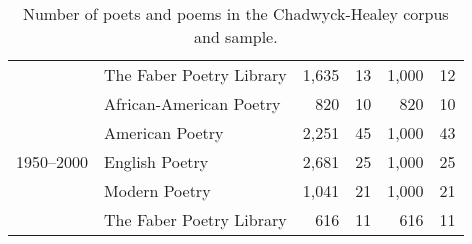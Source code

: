 \begin{table}[t]
{\begin{tabular}{llrrrr}
   & The Faber Poetry Library & 1,635 & 13 & 1,000 & 12 \\
  \cline{1-6}
  \multirow[t]{5}{*}{1950--2000} & African-American Poetry & 820 & 10 & 820 & 10 \\
   & American Poetry & 2,251 & 45 & 1,000 & 43 \\
   & English Poetry & 2,681 & 25 & 1,000 & 25 \\
   & Modern Poetry & 1,041 & 21 & 1,000 & 21 \\
   & The Faber Poetry Library & 616 & 11 & 616 & 11 \\
  \bottomrule
  \end{tabular}
  }
  \caption{Number of poets and poems in the Chadwyck-Healey corpus and sample.}
  \label{tab:num_poems_corpus}
\end{table}